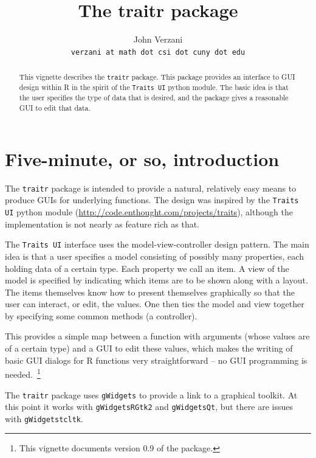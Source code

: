 \documentclass{article}
\newcommand{\code}[1]{\texttt{#1}} %
\newcommand{\pkg}[1]{\texttt{#1}}
\begin{document}
\thispagestyle{empty}

\thispagestyle{empty}



\title{The traitr package}
\author{John Verzani\\\texttt{verzani at math dot csi dot cuny dot edu}}
\maketitle
\begin{abstract}
  This vignette describes the \pkg{traitr} package. This package
  provides an interface to GUI design within R in the spirit of the
  \code{Traits UI} python module. The basic idea
  is that the user specifies the type of data that is desired, and the
  package gives a reasonable GUI to edit that data.
 \end{abstract}
 
\section{Five-minute, or so, introduction}
\label{sec:five-minute-intr}

The \pkg{traitr} package is intended to provide a natural, relatively
easy means to produce GUIs for underlying functions. The design was inspired by
the \code{Traits UI} python module
(\url{http://code.enthought.com/projects/traits}), although the
implementation is not nearly as feature rich as that.

The \code{Traits UI} interface uses the model-view-controller design
pattern. The main idea is that a user specifies a model consisting of
possibly many properties, each holding data of a certain type. Each
property we call an item. A view of the model is specified by
indicating which items are to be shown along with a layout. The items
themselves know how to present themselves graphically so that the user
can interact, or edit, the values. One then ties the model and view
together by specifying some common methods (a controller).

This provides a simple map between a function with arguments
(whose values are of a certain type) and a GUI to edit these values,
which makes the writing of basic GUI dialogs for R functions very
straightforward -- no GUI
programming is needed.~\footnote{This vignette documents
  version 0.9 of the package.}

The \pkg{traitr} package uses \pkg{gWidgets} to provide a link to a
graphical toolkit. At this point it works with \pkg{gWidgetsRGtk2} and
\pkg{gWidgetsQt}, but there are issues with \pkg{gWidgetstcltk}.
\end{document}
